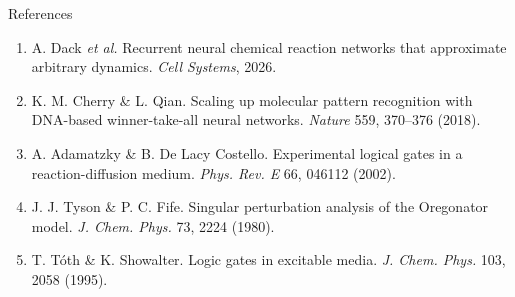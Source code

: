 \documentclass[aspectratio=169,11pt]{beamer}
\begin{document}
\begin{frame}{References}

{\footnotesize
\begin{enumerate}
    \item A. Dack \textit{et al.} Recurrent neural chemical reaction networks that approximate arbitrary dynamics. \textit{Cell Systems}, 2026.
    \item K. M. Cherry \& L. Qian. Scaling up molecular pattern recognition with DNA-based winner-take-all neural networks. \textit{Nature} 559, 370--376 (2018).
    \item A. Adamatzky \& B. De Lacy Costello. Experimental logical gates in a reaction-diffusion medium. \textit{Phys. Rev. E} 66, 046112 (2002).
    \item J. J. Tyson \& P. C. Fife. Singular perturbation analysis of the Oregonator model. \textit{J. Chem. Phys.} 73, 2224 (1980).
    \item T. T\'oth \& K. Showalter. Logic gates in excitable media. \textit{J. Chem. Phys.} 103, 2058 (1995).
\end{enumerate}
}

\end{frame}
\end{document}

